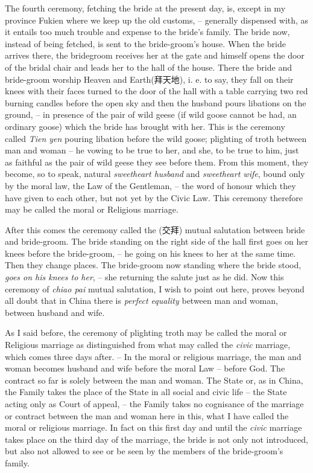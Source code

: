 The fourth ceremony, fetching the bride at the present day,
is, except in my province Fukien where we keep up the old customs,
--  generally dispensed with, as it entails too much trouble and expense to the bride's family.
The bride now, instead of being fetched, is sent to the bride-groom's house.
When the bride arrives there, the bridegroom receives her at the gate and himself opens the door of the bridal chair and leads her to the hall of the house.
There the bride and bride-groom worship Heaven and Earth(拜天地), i. e. to say,
they fall on their knees with their faces turned to the door of the hall with a table carrying two red burning candles before the open sky and then the husband pours libations on the ground,
-- in presence of the pair of wild geese
(if wild goose cannot be had, an ordinary goose)
which the bride has brought with her.
This is the ceremony called \emph{Tien yen} pouring libation before the wild goose;
plighting of troth between man and woman
-- he vowing to be true to her, and she, to be true to him,
just as faithful as the pair of wild geese they see before them.
From this moment, they become, so to speak, natural \emph{sweetheart husband} and \emph{sweetheart wife},
bound only by the moral law, the Law of the Gentleman,
-- the word of honour which they have given to each other,
but not yet by the Civic Law.
This ceremony therefore may be called the moral or Religious marriage.

After this comes the ceremony called the (交拜) mutual salutation between bride and bride-groom.
The bride standing on the right side of the hall first goes on her knees before the bride-groom,
-- he going on his knees to her at the same time.
Then they change places. The bride-groom now standing where the bride stood,
\emph{goes on his knees to her},
-- she returning the salute just as he did.
Now this ceremony of \emph{chiao pai} mutual salutation,
I wish to point out here, proves beyond all doubt
that in China there is \emph{perfect equality} between man and woman,
between husband and wife.

As I said before, the ceremony of plighting troth may be called
the moral or Religious marriage as distinguished from what may called the \emph{civic} marriage,
which comes three days after.
-- In the moral or religious marriage, the man and woman becomes husband and wife before the moral Law
-- before God. The contract so far is solely between the man and woman.
The State or, as in China, the Family takes the place of the State in all social and civic life
-- the State acting only as Court of appeal,
-- the Family takes no cognisance of the marriage or contract
between the man and woman here in this,
what I have called the moral or religious marriage.
In fact on this first day and until the \emph{civic} marriage takes place on the third day of the marriage,
the bride is not only not introduced,
but also not allowed to see or be seen by the members of the bride-groom's family.

